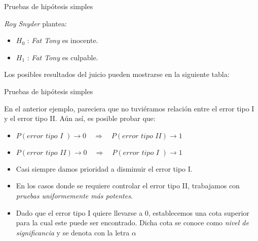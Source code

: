 \begin{frame}{Pruebas de hipótesis simples}
    \begin{example}
        \textit{Roy Snyder} plantea:
        \begin{itemize}
            \item $H_0$ : \textit{Fat Tony} es inocente.
            \item $H_1$ : \textit{Fat Tony} es culpable.
        \end{itemize}
        Los posibles resultados del juicio pueden mostrarse en la siguiente tabla:
        \begin{center}
        \end{center}
    \end{example}
\end{frame}




\begin{frame}{Pruebas de hipótesis simples}
    \begin{rr}
        En el anterior ejemplo, pareciera que no tuviéramos relación entre el error tipo I y el error tipo II. Aún así, es posible probar que:
        \begin{itemize}
            \item $P(\textit{error tipo I })\to0\quad \Longrightarrow \quad P(\textit{error tipo II} )\to 1$
            \item $P(\textit{error tipo II})\to0\quad \Longrightarrow \quad P(\textit{error tipo I } )\to 1$
        \end{itemize}
    \end{rr}
    \begin{itemize}[<+- | alert@+>]
        \item Casi siempre damos prioridad a disminuir el error tipo I.
        \item En los casos donde se requiere controlar el error tipo II, trabajamos con \textit{pruebas uniformemente más potentes}.
        \item Dado que el error tipo I quiere llevarse a 0, establecemos una cota superior para la cual este puede ser encontrado. Dicha cota se conoce como \textit{nivel de significancia} y se denota con la letra $\alpha$
        
    \end{itemize}
\end{frame}

